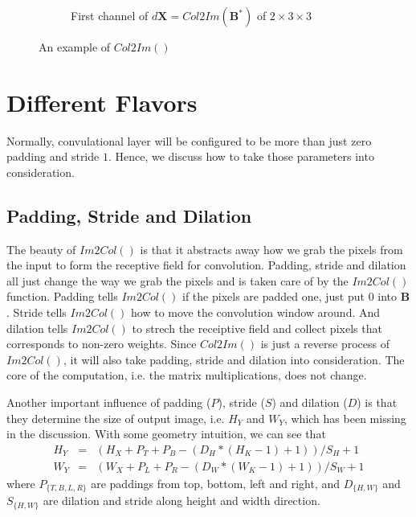 \documentclass[authordraft=true,dvipsnames]{acmart}
\newcommand{\bx}[0]{\mathbf{X}}
\newcommand{\bw}[0]{\mathbf{W}}
\newcommand{\by}[0]{\mathbf{Y}}
\newcommand{\bb}[0]{\mathbf{B}}
\begin{document}
\begin{figure}[h]
\begin{subfigure}[c]{0.75\textwidth}
\caption{First channel of $d\bx = Col2Im(\bb^*)$ of $2 \times 3 \times 3$}
\end{subfigure}
\caption{An example of $Col2Im()$ \label{dual}}
\end{figure}

\section{Different Flavors}
Normally, convulational layer will be configured to be more than just zero padding and stride $1$. Hence, we discuss how to take those parameters into consideration. 

\subsection{Padding, Stride and Dilation}
The beauty of $Im2Col()$ is that it abstracts away how we grab the pixels from the input to form the receptive field for convolution. Padding, stride and dilation all just change the way we grab the pixels and is taken care of by the $Im2Col()$ function. Padding tells $Im2Col()$ if the pixels are padded one, just put $0$ into $\bb$. Stride tells $Im2Col()$ how to move the convolution window around. And dilation tells $Im2Col()$ to strech the receiptive field and collect pixels that corresponds to non-zero weights. Since $Col2Im()$ is just a reverse process of $Im2Col()$, it will also take padding, stride and dilation into consideration. The core of the computation, i.e. the matrix multiplications, does not change.  

Another important influence of padding ($P$), stride ($S$) and dilation ($D$) is that they determine the size of output image, i.e. $H_Y$ and $W_Y$, which has been missing in the discussion. With some geometry intuition, we can see that
\begin{eqnarray}
H_Y &=& (H_X + P_T + P_B - (D_H * (H_K - 1) + 1)) / S_H + 1 \\
W_Y &=& (W_X + P_L + P_R - (D_W * (W_K - 1) + 1)) / S_W + 1 
\end{eqnarray}
where $P_{\{T,B,L,R\}}$ are paddings from top, bottom, left and right, and $D_{\{H,W\}}$ and $S_{\{H,W\}}$ are dilation and stride along height and width direction. 
\end{document}
